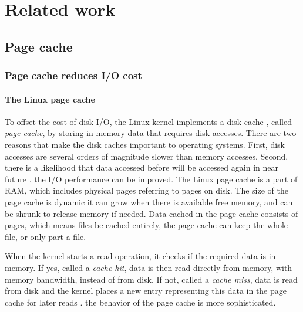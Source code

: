 \chapter{Related work}
\label{relatedwork}


\section{Page cache}

\subsection{Page cache reduces I/O cost}

\subsubsection{The Linux page cache}

To offset the cost of disk I/O, the Linux kernel implements a disk cache , 
called \textit{page cache}, by storing in memory data that requires 
disk accesses. 
There are two reasons that make the disk caches  important to 
operating systems. 
First, disk accesses are several orders of magnitude slower than 
memory accesses. 
Second, there is a likelihood that data accessed before will be accessed 
again in near future \cite{linuxdev3rd2010}. 
 the I/O performance can be  improved. 
The Linux page cache is a part of RAM, which includes physical pages 
referring to pages on disk. 
The size of the page cache is dynamic  it can grow when there is 
available free memory, and can be shrunk to release memory if needed. 
Data cached in the page cache consists of pages, which means files  be cached entirely, the page cache can keep the whole file, 
or only part a file. 

When the kernel starts a read operation, it checks if the required data is 
in memory. If yes, called a \textit{cache hit}, data is then read directly 
from memory, with memory bandwidth, instead of from disk. 
If not, called a \textit{cache miss}, data is read from disk and the kernel 
places a new entry representing this data in the page cache for later reads 
\cite{linuxdev3rd2010}. 
 the behavior of the page cache is more sophisticated.

